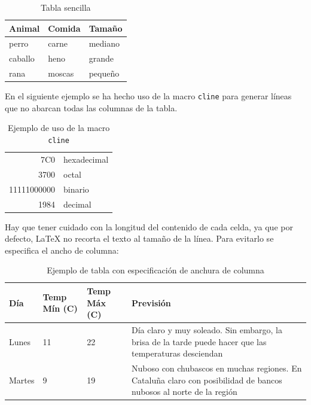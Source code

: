 \documentclass[11pt,a4paper]{article}
\begin{document}
\begin{table}[H]%
	\centering
	\caption[Ejemplo de entorno \texttt{table}]{Tabla sencilla}		  \label{tab:simple}
    \begin{tabular}{l|l|l}
      \textbf{Animal}  & \textbf{Comida} & \textbf{Tamaño} \\
      \hline
      perro   & carne  & mediano \\
      caballo & heno   & grande  \\
      rana    & moscas & pequeño \\
    \end{tabular}
\end{table}

En el siguiente ejemplo se ha hecho uso de la macro \texttt{cline} para generar líneas que no abarcan todas las columnas de la tabla.

\begin{table}[H]%
	\centering
	\caption{Ejemplo de uso de la macro \texttt{cline}}
	\label{tab:cline}
	\begin{tabular}[t]{|r|l|}
	\hline
	7C0 & hexadecimal \\[1cm] %
	3700 & octal \\ \cline{2-2}
	11111000000 & binario \\
	\hline \hline
	1984 & decimal \\
	\hline
	\end{tabular}
\end{table}

Hay que tener cuidado con la longitud del contenido de cada celda, ya que por defecto, \LaTeX{} no recorta el texto al tamaño de la línea. Para evitarlo se especifica el ancho de columna:

\begin{table}[H]%
	\centering
	\caption{Ejemplo de tabla con especificación de anchura de columna}
	\label{tab:anchura}
	\begin{tabular}{ | l | l | l | p{5cm} |}
	\hline
	Día & Temp Mín (\textdegree C) & Temp Máx (\textdegree C) & Previsión \\ \hline
	Lunes & 11 & 22 & Día claro y muy soleado. Sin embargo, la brisa de la tarde puede hacer que las temperaturas desciendan \\ \hline
	Martes & 9 & 19 & Nuboso con chubascos en muchas regiones. En Cataluña claro con posibilidad de bancos nubosos al norte de la región \\ 
    \hline
	\end{tabular}
\end{table}
\end{document}
